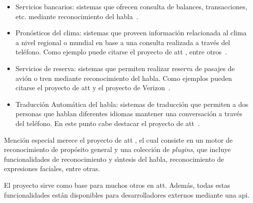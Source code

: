 \begin{itemize}
	\item Servicios bancarios: sistemas que ofrecen consulta de balances, transacciones, etc. mediante
	reconocimiento del \mbox{habla \cite{PreeEnhancing1999}}.

	\item Pron\'osticos del clima: sistemas que proveen informaci\'on relacionada al clima a nivel
	regional o mundial en base a una consulta realizada a trav\'es del tel\'efono. Como ejemplo puede
	citarse el proyecto  de \gls{att} \cite{ZueJupiter2000}, entre \mbox{otros \cite{ZibertBiliengual2003}}.

	\item Servicios de reserva: sistemas que permiten realizar reserva de pasajes de avi\'on o tren 
	mediante reconocimiento del habla. Como ejemplos pueden citarse el proyecto  
	de \gls{att} \cite{Seneff2000Dialogue} y el proyecto  de 
	\mbox{Verizon \cite{StallardEvaluation2001}}.

	\item Traducci\'on Autom\'atica del habla: sistemas de traducci\'on que permiten a dos personas 
	que hablan diferentes idiomas mantener una conversaci\'on a trav\'es del tel\'efono. 
	En este punto cabe destacar el proyecto  de \mbox{\gls{att} \cite{Rangarajan2012}}.
\end{itemize}

Menci\'on especial merece el proyecto  de \gls{att} \cite{AttWatson}, el cual consiste en 
un motor de reconocimiento de prop\'osito general y una colecci\'on de \emph{plugins}, que incluye 
funcionalidades de reconocimiento y s{\'\i}ntesis del habla, reconocimiento de expresiones faciales, 
entre otras. 

El proyecto  sirve como base para muchos otros en \gls{att}. 
Adem\'as, todas estas funcionalidades est\'an disponibles para desarrolladores externos mediante una \gls{api}. 